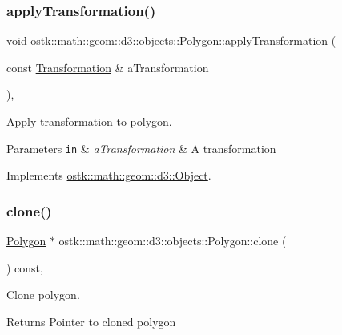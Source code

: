 \subsubsection{\texorpdfstring{apply\+Transformation()}{applyTransformation()}}
{\footnotesize\ttfamily void ostk\+::math\+::geom\+::d3\+::objects\+::\+Polygon\+::apply\+Transformation (\begin{DoxyParamCaption}\item[{const \hyperlink{classostk_1_1math_1_1geom_1_1d3_1_1_transformation}{Transformation} \&}]{a\+Transformation }\end{DoxyParamCaption})\hspace{0.3cm}{\ttfamily [override]}, {\ttfamily [virtual]}}



Apply transformation to polygon. 


\begin{DoxyParams}[1]{Parameters}
\mbox{\tt in}  & {\em a\+Transformation} & A transformation \\
\hline
\end{DoxyParams}


Implements \hyperlink{classostk_1_1math_1_1geom_1_1d3_1_1_object_ae9194dd6d2bb4df09292ffc84dccdb1d}{ostk\+::math\+::geom\+::d3\+::\+Object}.

\mbox{\label{classostk_1_1math_1_1geom_1_1d3_1_1objects_1_1_polygon_a20f5870ed64f26d0f8e77040ececb60a}} 
\subsubsection{\texorpdfstring{clone()}{clone()}}
{\footnotesize\ttfamily \hyperlink{classostk_1_1math_1_1geom_1_1d3_1_1objects_1_1_polygon}{Polygon} $\ast$ ostk\+::math\+::geom\+::d3\+::objects\+::\+Polygon\+::clone (\begin{DoxyParamCaption}{ }\end{DoxyParamCaption}) const\hspace{0.3cm}{\ttfamily [override]}, {\ttfamily [virtual]}}



Clone polygon. 

\begin{DoxyReturn}{Returns}
Pointer to cloned polygon 
\end{DoxyReturn}


